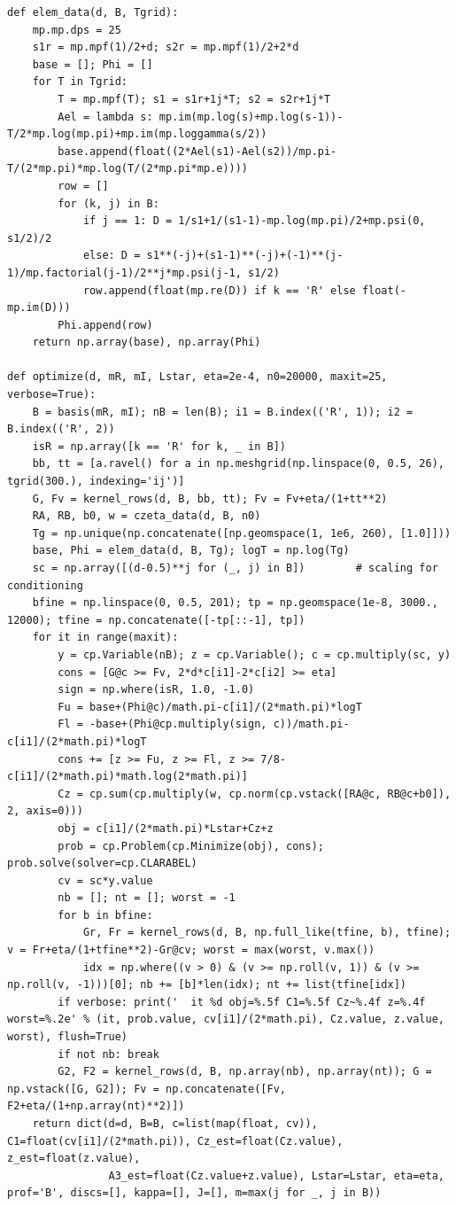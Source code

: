 \documentclass[11pt,reqno]{amsart}
\numberwithin{equation}{section}
\theoremstyle{definition}
\theoremstyle{remark}
\begin{document}
\begin{lstlisting}
def elem_data(d, B, Tgrid):
    mp.mp.dps = 25
    s1r = mp.mpf(1)/2+d; s2r = mp.mpf(1)/2+2*d
    base = []; Phi = []
    for T in Tgrid:
        T = mp.mpf(T); s1 = s1r+1j*T; s2 = s2r+1j*T
        Ael = lambda s: mp.im(mp.log(s)+mp.log(s-1))-T/2*mp.log(mp.pi)+mp.im(mp.loggamma(s/2))
        base.append(float((2*Ael(s1)-Ael(s2))/mp.pi-T/(2*mp.pi)*mp.log(T/(2*mp.pi*mp.e))))
        row = []
        for (k, j) in B:
            if j == 1: D = 1/s1+1/(s1-1)-mp.log(mp.pi)/2+mp.psi(0, s1/2)/2
            else: D = s1**(-j)+(s1-1)**(-j)+(-1)**(j-1)/mp.factorial(j-1)/2**j*mp.psi(j-1, s1/2)
            row.append(float(mp.re(D)) if k == 'R' else float(-mp.im(D)))
        Phi.append(row)
    return np.array(base), np.array(Phi)

def optimize(d, mR, mI, Lstar, eta=2e-4, n0=20000, maxit=25, verbose=True):
    B = basis(mR, mI); nB = len(B); i1 = B.index(('R', 1)); i2 = B.index(('R', 2))
    isR = np.array([k == 'R' for k, _ in B])
    bb, tt = [a.ravel() for a in np.meshgrid(np.linspace(0, 0.5, 26), tgrid(300.), indexing='ij')]
    G, Fv = kernel_rows(d, B, bb, tt); Fv = Fv+eta/(1+tt**2)
    RA, RB, b0, w = czeta_data(d, B, n0)
    Tg = np.unique(np.concatenate([np.geomspace(1, 1e6, 260), [1.0]]))
    base, Phi = elem_data(d, B, Tg); logT = np.log(Tg)
    sc = np.array([(d-0.5)**j for (_, j) in B])        # scaling for conditioning
    bfine = np.linspace(0, 0.5, 201); tp = np.geomspace(1e-8, 3000., 12000); tfine = np.concatenate([-tp[::-1], tp])
    for it in range(maxit):
        y = cp.Variable(nB); z = cp.Variable(); c = cp.multiply(sc, y)
        cons = [G@c >= Fv, 2*d*c[i1]-2*c[i2] >= eta]
        sign = np.where(isR, 1.0, -1.0)
        Fu = base+(Phi@c)/math.pi-c[i1]/(2*math.pi)*logT
        Fl = -base+(Phi@cp.multiply(sign, c))/math.pi-c[i1]/(2*math.pi)*logT
        cons += [z >= Fu, z >= Fl, z >= 7/8-c[i1]/(2*math.pi)*math.log(2*math.pi)]
        Cz = cp.sum(cp.multiply(w, cp.norm(cp.vstack([RA@c, RB@c+b0]), 2, axis=0)))
        obj = c[i1]/(2*math.pi)*Lstar+Cz+z
        prob = cp.Problem(cp.Minimize(obj), cons); prob.solve(solver=cp.CLARABEL)
        cv = sc*y.value
        nb = []; nt = []; worst = -1
        for b in bfine:
            Gr, Fr = kernel_rows(d, B, np.full_like(tfine, b), tfine); v = Fr+eta/(1+tfine**2)-Gr@cv; worst = max(worst, v.max())
            idx = np.where((v > 0) & (v >= np.roll(v, 1)) & (v >= np.roll(v, -1)))[0]; nb += [b]*len(idx); nt += list(tfine[idx])
        if verbose: print('  it %d obj=%.5f C1=%.5f Cz~%.4f z=%.4f worst=%.2e' % (it, prob.value, cv[i1]/(2*math.pi), Cz.value, z.value, worst), flush=True)
        if not nb: break
        G2, F2 = kernel_rows(d, B, np.array(nb), np.array(nt)); G = np.vstack([G, G2]); Fv = np.concatenate([Fv, F2+eta/(1+np.array(nt)**2)])
    return dict(d=d, B=B, c=list(map(float, cv)), C1=float(cv[i1]/(2*math.pi)), Cz_est=float(Cz.value), z_est=float(z.value),
                A3_est=float(Cz.value+z.value), Lstar=Lstar, eta=eta, prof='B', discs=[], kappa=[], J=[], m=max(j for _, j in B))


\end{lstlisting}
\end{document}
